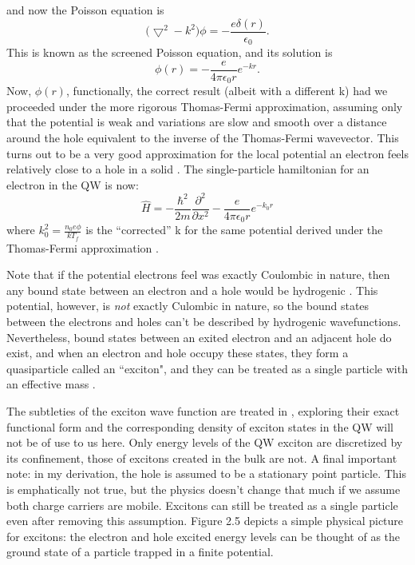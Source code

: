 and now the Poisson equation is
\begin{equation}
\big(\bigtriangledown^2 - k^2 \big) \phi = - \frac{e \delta(r)}{\epsilon_0}.
\end{equation}
This is known as the screened Poisson equation, and its solution is
\begin{equation}
\phi(r) = -\frac{e}{4\pi \epsilon_0 r} e^{-k r}.
\end{equation}
\indent Now, $\phi(r)$, functionally,  the correct result (albeit with a different k) had we proceeded under the more rigorous Thomas-Fermi approximation, assuming only that the potential is weak and variations are slow and smooth over a distance around the hole equivalent to the inverse of the Thomas-Fermi wavevector. This turns out to be a very good approximation for the local potential an electron feels relatively close to a hole in a solid \cite{patterson}. The single-particle hamiltonian for an electron in the QW is now:
\begin{equation}
\hat{H} = - \frac{\hbar^2}{2m} \frac{\partial^2}{\partial x^2} - \frac{e}{4\pi \epsilon_0 r} e^{-k_0 r}
\end{equation}
where $k_0^2 = \frac{n_0 e\phi}{k T_f}$ is the ``corrected'' k for the same potential derived under the Thomas-Fermi approximation \cite{patterson}. 

\indent Note that if the potential electrons feel was exactly Coulombic in nature, then any bound state between an electron and a hole would be hydrogenic \cite{griffiths}. This potential, however, is \textit{not} exactly Culombic in nature, so the bound states between the electrons and holes can't be described by hydrogenic wavefunctions. Nevertheless, bound states between an exited electron and an adjacent hole do exist, and when an electron and hole occupy these states, they form a quasiparticle called an ``exciton", and they can be treated as a single particle with an effective mass \cite{iadonisi, davies}.

\indent The subtleties of the exciton wave function are treated in \cite{iadonisi}, exploring their exact functional form and the corresponding density of exciton states in the QW will not be of use to us here. Only energy levels of the QW exciton are discretized by its confinement, those of excitons created in the bulk are not. A final important note: in my derivation, the hole is assumed to be a stationary point particle. This is emphatically not true, but the physics doesn't change that much if we assume both charge carriers are mobile. Excitons can still be treated as a single particle even after removing this assumption. Figure 2.5 depicts a simple physical picture for excitons: the electron and hole excited energy levels can be thought of as the ground state of a particle trapped in a finite potential.  

